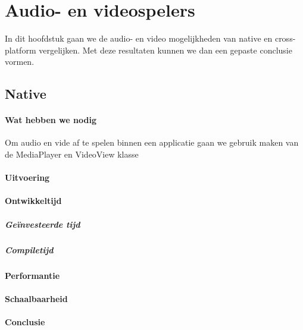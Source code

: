 
\chapter{Audio- en videospelers}%
\label{ch:audioenvideo}

In dit hoofdstuk gaan we de audio- en video mogelijkheden van native en cross-platform vergelijken. 
Met deze resultaten kunnen we dan een gepaste conclusie vormen.

\section{Native}
\subsubsection{Wat hebben we nodig}
Om audio en vide af te spelen binnen een applicatie gaan we gebruik maken van de MediaPlayer en 
VideoView klasse

\subsubsection{Uitvoering}

\subsubsection{Ontwikkeltijd}

\paragraph{Geïnvesteerde tijd}

\paragraph{Compiletijd}

\subsubsection{Performantie}

\subsubsection{Schaalbaarheid}

\subsubsection{Conclusie}


